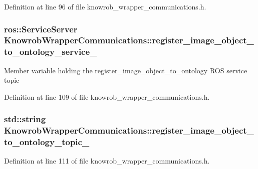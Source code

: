 Definition at line 96 of file knowrob\-\_\-wrapper\-\_\-communications.\-h.

\hypertarget{classKnowrobWrapperCommunications_a80d24d312e258d4b546573d4eaeb6a16}{
\subsubsection[{register\-\_\-image\-\_\-object\-\_\-to\-\_\-ontology\-\_\-service\-\_\-}]{\setlength{\rightskip}{0pt plus 5cm}ros\-::\-Service\-Server Knowrob\-Wrapper\-Communications\-::register\-\_\-image\-\_\-object\-\_\-to\-\_\-ontology\-\_\-service\-\_\-\hspace{0.3cm}{\ttfamily [private]}}}\label{classKnowrobWrapperCommunications_a80d24d312e258d4b546573d4eaeb6a16}
Member variable holding the register\-\_\-image\-\_\-object\-\_\-to\-\_\-ontology R\-O\-S service topic 

Definition at line 109 of file knowrob\-\_\-wrapper\-\_\-communications.\-h.

\hypertarget{classKnowrobWrapperCommunications_aeeadfeab13814b51e78182bb52358303}{
\subsubsection[{register\-\_\-image\-\_\-object\-\_\-to\-\_\-ontology\-\_\-topic\-\_\-}]{\setlength{\rightskip}{0pt plus 5cm}std\-::string Knowrob\-Wrapper\-Communications\-::register\-\_\-image\-\_\-object\-\_\-to\-\_\-ontology\-\_\-topic\-\_\-\hspace{0.3cm}{\ttfamily [private]}}}\label{classKnowrobWrapperCommunications_aeeadfeab13814b51e78182bb52358303}


Definition at line 111 of file knowrob\-\_\-wrapper\-\_\-communications.\-h.

